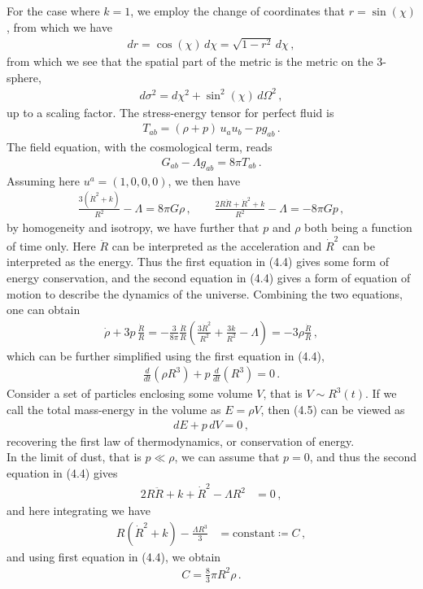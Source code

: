 \documentclass[11pt, onesided]{book}
\theoremstyle{break}
\theoremstyle{break}
\begin{document}
For the case where $k=1$, we employ the change of coordinates that $r = \sin(\chi)$, from which we have
\begin{align*}
dr = \cos(\chi) \, d\chi = \sqrt{1-r^2}\, d\chi\,,
\end{align*}
from which we see that the spatial part of the metric is the metric on the $3$-sphere,
\begin{align*}
d\sigma^2 = d\chi^2 + \sin^2(\chi)\, d\Omega^2\,,
\end{align*}
up to a scaling factor. The stress-energy tensor for perfect fluid is
\begin{align*}
T_{ab} = (\rho+p) \, u_a u_b - pg_{ab}\,.
\end{align*}
The field equation, with the cosmological term, reads
\begin{align*}
G_{ab} - \Lambda g_{ab} = 8\pi T_{ab}\,.
\end{align*}
Assuming here $u^a= (1,0,0,0)$, we then have
\begin{align}
\frac{3(\dot{R}^2 + k)}{R^2} - \Lambda = 8\pi G\rho \,,\qquad
\frac{2R\ddot{R}+ \dot{R}^2 + k}{R^2} - \Lambda = -8\pi G p\,,
\end{align}
by homogeneity and isotropy, we have further that $p$ and $\rho$ both being a function of time only. Here $\ddot{R}$ can be interpreted as the acceleration and $\dot{R}^2$ can be interpreted as the energy. Thus the first equation in (4.4) gives some form of energy conservation, and the second equation in (4.4) gives a form of equation of motion to describe the dynamics of the universe. Combining the two equations, one can obtain
\begin{align*}
\dot{\rho} + 3p \, \frac{\dot{R}}{R} = -\frac{3}{8\pi}\frac{\dot{R}}{R}\left(\frac{3\dot{R}^2}{R^2} + \frac{3k}{R^2}-\Lambda \right) = -3\rho \frac{\dot{R}}{R}\,,
\end{align*}
which can be further simplified using the first equation in (4.4),
\begin{align}
\frac{d}{dt}(\rho R^3) + p \, \frac{d}{dt}(R^3) = 0\,.
\end{align}
Consider a set of particles enclosing some volume $V$, that is $V \sim R^3(t)$. If we call the total mass-energy in the volume as $E = \rho V$, then (4.5) can be viewed as
\begin{align*}
dE  + p\, dV = 0\,,
\end{align*}
recovering the first law of thermodynamics, or conservation of energy. \\

In the limit of dust, that is $p\ll \rho$, we can assume that $p = 0$, and thus the second equation in (4.4) gives
\begin{align*}
2R\ddot{R} + k + \dot{R}^2 - \Lambda R^2 &= 0\,,
\end{align*}
and here integrating we have
\begin{align}
R(\dot{R}^2 + k) - \frac{\Lambda R^3}{3} &= \text{constant} \coloneqq C\,,
\end{align}
and using first equation in (4.4), we obtain
\begin{align*}
C = \frac{8}{3} \pi R^2  \rho\,.
\end{align*}
\end{document}

